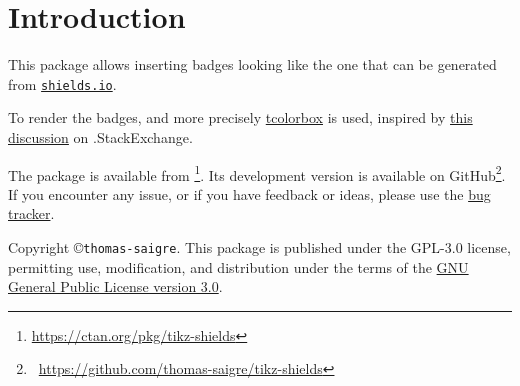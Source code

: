 \section{Introduction}

This package allows inserting badges looking like the one that can be generated from \href{https://shields.io/}{\texttt{shields.io}}.

To render the badges, \href{https://www.ctan.org/pkg/pgf}{\TikZ{}} and more precisely \href{https://www.ctan.org/pkg/tcolorbox}{\textsf{tcolorbox}} is used,
inspired by \href{https://tex.stackexchange.com/questions/508555/duplicating-shields-io-badges}{this discussion} on \tex.StackExchange.

The package is available from \CTAN\footnote{\url{https://ctan.org/pkg/tikz-shields}}.
Its development version is available on GitHub\footnote{\faGithub~\url{https://github.com/thomas-saigre/tikz-shields}}.
If you encounter any issue, or if you have feedback or ideas, please use the \href{https://github.com/thomas-saigre/tikz-shields/issues}{bug tracker}.

Copyright \copyright \texttt{thomas-saigre}.
This package is published under the GPL-3.0 license, permitting use, modification, and distribution under the terms of the \href{https://github.com/thomas-saigre/tikz-shields?tab=GPL-3.0-1-ov-file}{GNU General Public License version 3.0}.

\tableofcontents
